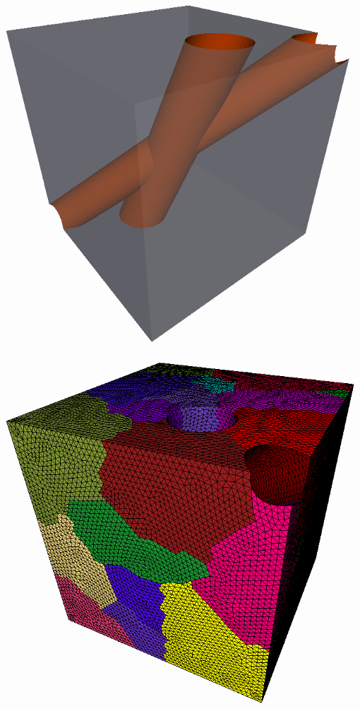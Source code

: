 \documentclass[compress,12pt]{beamer}
\begin{document}
\begin{frame}%
   {\centerline{\includegraphics[height=.8\textheight]{figures/geometry_transparent}}}
   {\centerline{\includegraphics[height=.8\textheight]{figures/part_trans}}}
\end{frame}
\end{document}
